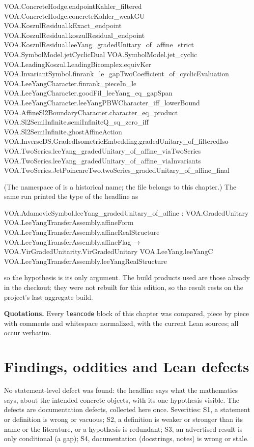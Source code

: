 \begin{plaincode}
VOA.ConcreteHodge.endpointKahler_filtered
VOA.ConcreteHodge.concreteKahler_weakGU
VOA.KoszulResidual.kExact_endpoint
VOA.KoszulResidual.koszulResidual_endpoint
VOA.KoszulResidual.leeYang_gradedUnitary_of_affine_strict
VOA.SymbolModel.jetCyclicDual
VOA.SymbolModel.jet_cyclic
VOA.LeadingKoszul.LeadingBicomplex.equivKer
VOA.InvariantSymbol.finrank_le_gapTwoCoefficient_of_cyclicEvaluation
VOA.LeeYangCharacter.finrank_pieceIn_le
VOA.LeeYangCharacter.goodFil_leeYang_eq_gapSpan
VOA.LeeYangCharacter.leeYangPBWCharacter_iff_lowerBound
VOA.AffineSl2BoundaryCharacter.character_eq_product
VOA.Sl2SemiInfinite.semiInfiniteQ_sq_zero_iff
VOA.Sl2SemiInfinite.ghostAffineAction
VOA.InverseDS.GradedIsometricEmbedding.gradedUnitary_of_filteredIso
VOA.TwoSeries.leeYang_gradedUnitary_of_affine_viaTwoSeries
VOA.TwoSeries.leeYang_gradedUnitary_of_affine_viaInvariants
VOA.TwoSeries.JetPoincareTwo.twoSeries_gradedUnitary_of_affine_final
\end{plaincode}
(The namespace  of  is a historical name; the file
 belongs to this chapter.) The same run printed the type of the headline as
\begin{plaincode}
VOA.AdamovicSymbol.leeYang_gradedUnitary_of_affine : VOA.GradedUnitary VOA.LeeYangTransferAssembly.affineForm
    VOA.LeeYangTransferAssembly.affineRealStructure VOA.LeeYangTransferAssembly.affineFlag →
  VOA.VirGradedUnitarity.VirGradedUnitary VOA.LeeYang.leeYangC VOA.LeeYangTransferAssembly.leeYangRealStructure
\end{plaincode}
so the hypothesis  is its only argument. The build products used are those already in the checkout; they were not rebuilt for this
edition, so the result rests on the project's last aggregate build.

\textbf{Quotations.} Every \texttt{leancode} block of this chapter was compared, piece by piece with comments and whitespace normalized,
with the current Lean sources; all occur verbatim.

\section{Findings, oddities and Lean defects}\label{l28:sec:defects}

No statement-level defect was found: the headline says what the mathematics says, about the intended concrete objects, with its one hypothesis
visible. The defects are documentation defects, collected here once. Severities: S1, a statement or definition is wrong or vacuous; S2, a definition is weaker or stronger than its name or the literature, or a hypothesis is redundant; S3, an advertised result is only conditional (a gap); S4, documentation (docstrings, notes) is wrong or stale.

